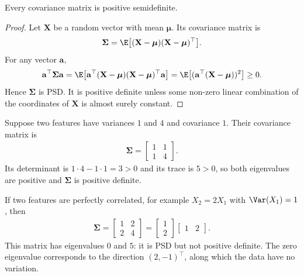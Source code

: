 \documentclass[a4paper, 12pt]{book}
\begin{document}
\begin{theorem}
    Every covariance matrix is positive semidefinite.
\end{theorem}
\begin{proof}
    Let $\mathbf{X}$ be a random vector with mean $\boldsymbol{\mu}$. Its covariance
    matrix is
    \begin{align}
        \boldsymbol{\Sigma}
        = \E\big[(\mathbf{X}-\boldsymbol{\mu})(\mathbf{X}-\boldsymbol{\mu})^\top\big].
    \end{align}
    For any vector $\mathbf{a}$,
    \begin{align}
        \mathbf{a}^\top\boldsymbol{\Sigma}\mathbf{a}
        = \E\big[\mathbf{a}^\top(\mathbf{X}-\boldsymbol{\mu})
          (\mathbf{X}-\boldsymbol{\mu})^\top\mathbf{a}\big]
        = \E\big[(\mathbf{a}^\top(\mathbf{X}-\boldsymbol{\mu}))^2\big] \geq 0.
    \end{align}
    Hence $\boldsymbol{\Sigma}$ is PSD. It is positive definite unless some non-zero
    linear combination of the coordinates of $\mathbf{X}$ is almost surely constant.
\end{proof}

\begin{example}
    Suppose two features have variances $1$ and $4$ and covariance $1$. Their
    covariance matrix is
    \begin{align}
        \boldsymbol{\Sigma} = \begin{bmatrix}1&1\\1&4\end{bmatrix}.
    \end{align}
    Its determinant is $1\cdot4-1\cdot1=3>0$ and its trace is $5>0$, so both
    eigenvalues are positive and $\boldsymbol{\Sigma}$ is positive definite.
\end{example}

\begin{example}
    If two features are perfectly correlated, for example $X_2 = 2X_1$ with
    $\Var(X_1)=1$, then
    \begin{align}
        \boldsymbol{\Sigma}
        = \begin{bmatrix}1&2\\2&4\end{bmatrix}
        = \begin{bmatrix}1\\2\end{bmatrix}\begin{bmatrix}1&2\end{bmatrix}.
    \end{align}
    This matrix has eigenvalues $0$ and $5$: it is PSD but not positive definite. The
    zero eigenvalue corresponds to the direction $(2,-1)^\top$, along which the data
    have no variation.
\end{example}
\end{document}
